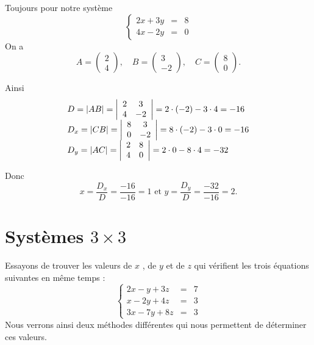 \begin{exemple}
Toujours pour notre système 
$$
\left\{
\begin{array}{lll}
2x+3y &=& 8\\
4x-2y &=& 0
\end{array}
\right.
$$
On a 
$$
A = \left(\begin{array}{c}2 \\ 4 \end{array} \right),\quad
B = \left(\begin{array}{c}3 \\ -2 \end{array} \right),\quad
C = \left(\begin{array}{c}8 \\ 0 \end{array} \right).
$$

Ainsi 
$$
\begin{array}{l}
D = \left|AB\right| = \left|\begin{array}{cc}
2 & 3 \\
4 & -2
\end{array}\right|
= 2\cdot (-2) - 3\cdot 4 = -16
\\
D_x = \left|CB\right| = \left|\begin{array}{cc}
8 & 3 \\
0 & -2
\end{array}\right|
= 8\cdot (-2) - 3\cdot 0 = -16
\\
D_y = \left|AC\right| = \left|\begin{array}{cc}
2 & 8 \\
4 & 0
\end{array}\right|
= 2\cdot 0 - 8\cdot 4 = -32
\end{array}
$$

Donc 
$$
x = \frac{D_x}{D} = \frac{-16}{-16}= 1 \mbox{ et } y = \frac{D_y}{D} = \frac{-32}{-16}= 2.
$$
\end{exemple}

\section{Systèmes $3\times 3$}


Essayons de trouver les valeurs de $x$ , de $y$ et de $z$ qui vérifient les trois équations suivantes en même temps :
$$
\left\{
\begin{array}{lll}
2x-y+3z &=& 7\\
x-2y+4z &=& 3\\
3x-7y+8z &=& 3
\end{array}
\right.
$$
Nous verrons ainsi deux méthodes différentes qui nous permettent de déterminer ces valeurs.

